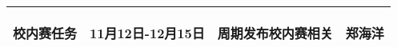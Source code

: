 \begin{longtable}{ p{1.5cm} | p{3cm} | p{6cm} | p{4.3cm} |}
    \hline
    
        \begin{center}
            校内赛任务
        \end{center}&
        \begin{center}
            11月12日-12月15日
        \end{center}&
        \begin{center}
            周期发布校内赛相关
        \end{center}&
        \begin{center}
            郑海洋
        \end{center}\\

    \hline
    
\end{longtable}
